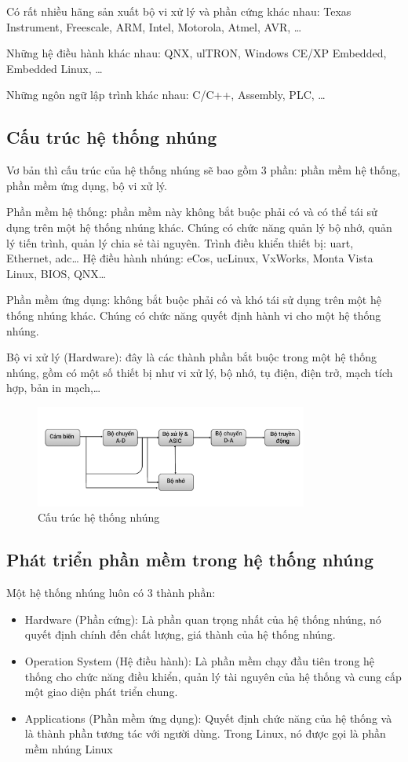 \documentclass{report}
\begin{document}
Có rất nhiều hãng sản xuất bộ vi xử lý và phần cứng khác nhau: Texas Instrument, Freescale, ARM, Intel, Motorola, Atmel, AVR, …

Những hệ điều hành khác nhau: QNX, ulTRON, Windows CE/XP Embedded, Embedded Linux, …

Những ngôn ngữ lập trình khác nhau: C/C++, Assembly, PLC, …

\subsection{Cấu trúc hệ thống nhúng}

Vơ bản thì cấu trúc của hệ thống nhúng sẽ bao gồm 3 phần: phần mềm hệ thống, phần mềm ứng dụng, bộ vi xử lý.

Phần mềm hệ thống: phần mềm này không bắt buộc phải có và có thể tái sử dụng trên một hệ thống nhúng khác. Chúng có chức năng quản lý bộ nhớ, quản lý tiến trình, quản lý chia sẻ tài nguyên. Trình điều khiển thiết bị: \acrshort{uart}, Ethernet, \acrshort{adc}… Hệ điều hành nhúng: eCos, ucLinux, VxWorks, Monta Vista Linux, BIOS, QNX…

Phần mềm ứng dụng: không bắt buộc phải có và khó tái sử dụng trên một hệ thống nhúng khác. Chúng có chức năng quyết định hành vi cho một hệ thống nhúng.

Bộ vi xử lý (Hardware): đây là các thành phần bắt buộc trong một hệ thống nhúng, gồm có một số thiết bị như vi xử lý, bộ nhớ, tụ điện, điện trở, mạch tích hợp, bản in mạch,…

\begin{figure}[H]
	\centering
	\includegraphics[width=0.8\textwidth]{../images/cau-truc-he-thong-nhung.png}
	\caption{Cấu trúc hệ thống nhúng}
\end{figure}

\subsection{Phát triển phần mềm trong hệ thống nhúng}
Một hệ thống nhúng luôn có 3 thành phần:
\begin{itemize}
	\item Hardware (Phần cứng): Là phần quan trọng nhất của hệ thống nhúng, nó quyết định chính đến chất lượng, giá thành của hệ thống nhúng.
	\item Operation System (Hệ điều hành): Là phần mềm chạy đầu tiên trong hệ thống cho chức năng điều khiển, quản lý tài nguyên của hệ thống và cung cấp một giao diện phát triển chung.
	\item Applications (Phần mềm ứng dụng): Quyết định chức năng của hệ thống và là thành phần tương tác với người dùng. Trong Linux, nó được gọi là phần mềm nhúng Linux
\end{itemize}
\end{document}
